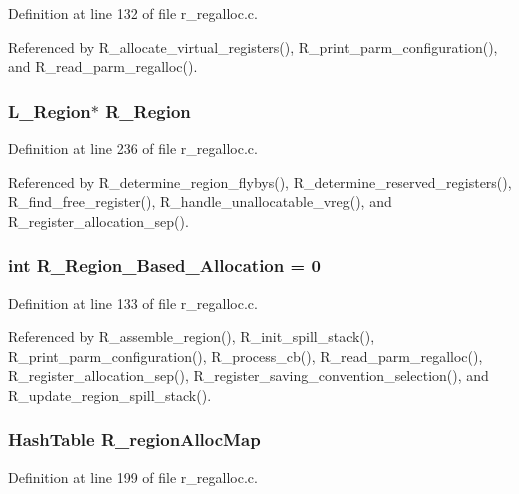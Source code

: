 Definition at line 132 of file r\_\-regalloc.c.

Referenced by R\_\-allocate\_\-virtual\_\-registers(), R\_\-print\_\-parm\_\-configuration(), and R\_\-read\_\-parm\_\-regalloc().
\subsubsection{\setlength{\rightskip}{0pt plus 5cm}L\_\-Region$\ast$ \bf{R\_\-Region}}\label{r__regalloc_8c_8dcb42f5ea3c18a0cd300b269c24235a}




Definition at line 236 of file r\_\-regalloc.c.

Referenced by R\_\-determine\_\-region\_\-flybys(), R\_\-determine\_\-reserved\_\-registers(), R\_\-find\_\-free\_\-register(), R\_\-handle\_\-unallocatable\_\-vreg(), and R\_\-register\_\-allocation\_\-sep().
\subsubsection{\setlength{\rightskip}{0pt plus 5cm}int \bf{R\_\-Region\_\-Based\_\-Allocation} = 0}\label{r__regalloc_8c_0730ca7568a827089b1d7aeaf18064d1}




Definition at line 133 of file r\_\-regalloc.c.

Referenced by R\_\-assemble\_\-region(), R\_\-init\_\-spill\_\-stack(), R\_\-print\_\-parm\_\-configuration(), R\_\-process\_\-cb(), R\_\-read\_\-parm\_\-regalloc(), R\_\-register\_\-allocation\_\-sep(), R\_\-register\_\-saving\_\-convention\_\-selection(), and R\_\-update\_\-region\_\-spill\_\-stack().
\subsubsection{\setlength{\rightskip}{0pt plus 5cm}\bf{Hash\-Table} \bf{R\_\-region\-Alloc\-Map}}\label{r__regalloc_8c_5995532566d405c35426e58b54ec4cc5}




Definition at line 199 of file r\_\-regalloc.c.

